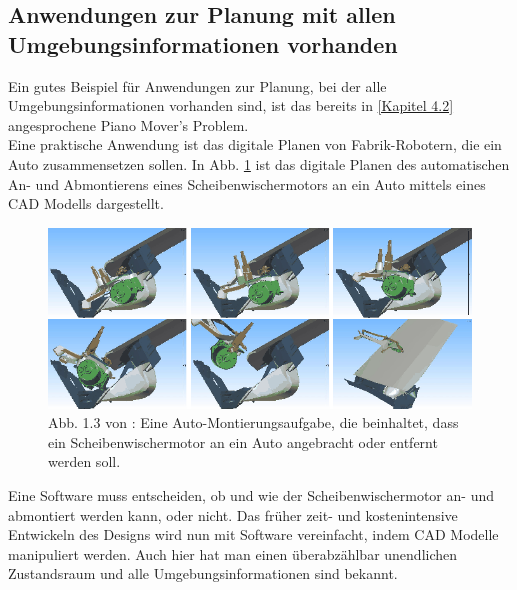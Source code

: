 \subsection{Anwendungen zur Planung mit allen Umgebungsinformationen vorhanden}
Ein gutes Beispiel für Anwendungen zur Planung, bei der alle Umgebungsinformationen vorhanden sind, ist das bereits in \ref{Kapitel 4.2} angesprochene Piano Mover's Problem.\\
Eine praktische Anwendung ist das digitale Planen von Fabrik-Robotern, die ein Auto zusammensetzen sollen. In Abb. \ref{Abb. 5.2} ist das digitale Planen des automatischen An- und Abmontierens eines Scheibenwischermotors an ein Auto mittels eines CAD Modells dargestellt.
\begin{figure}
	\centering
	\includegraphics[width=0.7\linewidth]{images/img231}
	\caption{Abb. 1.3 von \cite[~S. 7]{Lav06}: Eine Auto-Montierungsaufgabe, die beinhaltet, dass ein Scheibenwischermotor an ein Auto angebracht oder entfernt werden soll.}
	\label{Abb. 5.2}
\end{figure}

Eine Software muss entscheiden, ob und wie der Scheibenwischermotor an- und abmontiert werden kann, oder nicht. Das früher zeit- und kostenintensive Entwickeln des Designs wird nun mit Software vereinfacht, indem CAD Modelle manipuliert werden. Auch hier hat man einen überabzählbar unendlichen Zustandsraum und alle Umgebungsinformationen sind bekannt. \cite[~S. 6 ff]{Lav06}
